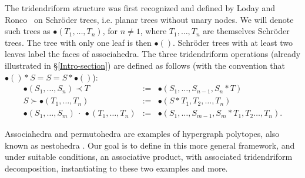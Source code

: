 \documentclass[11pt]{article}
\theoremstyle{definition}
\numberwithin{equation}{section}
\numberwithin{equation}{section}
\newcommand{\bcdot}{\,{\bm \cdot}\,}
\begin{document}
The tridendriform structure was first recognized and defined by Loday and Ronco~\cite{LR} on Schr\"oder trees, i.e. planar trees without  unary nodes. We will denote such trees as $\bullet(T_1,\ldots,T_n)$, for $n\neq 1$, where $T_1, \ldots, T_n$ are themselves Schr\"oder trees. The tree with only one leaf is then $\bullet()$.
Schr\"oder trees with at least two leaves label the faces of associahedra.
The three tridendriform operations  (already illustrated in \S\ref{Intro-section}) are defined as follows (with the convention that $\bullet() \ast S=S=S\ast\bullet()$):
$$\begin{array}{rcl}
\bullet(S_1,\ldots,S_n)\prec T & :=& \bullet (S_1,\ldots,S_{n-1},S_n\ast T)\\
S\succ \bullet (T_1,\ldots,T_n) & := & \bullet(S\ast T_1,T_2,\ldots,T_n) \\
\bullet(S_1,\ldots,S_m) \:\bcdot\: \bullet(T_1,\ldots,T_n) & := & \bullet(S_1,\ldots,S_{m-1}, S_m\ast T_1,T_2\ldots,T_n) .
\end{array}$$

Associahedra and permutohedra are examples of hypergraph polytopes, also known as nestohedra \cite{P09,FS05}. Our goal is to define in this more general framework, and under suitable conditions, an associative product, with associated tridendriform decomposition, instantiating to these two examples and  more.
\end{document}
